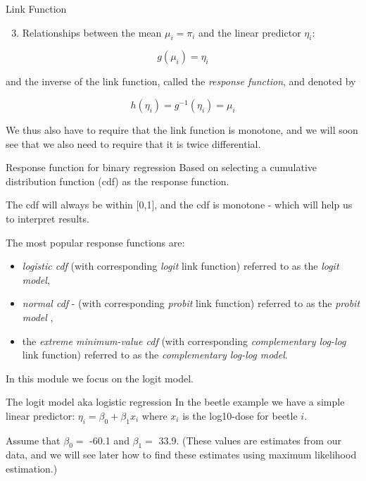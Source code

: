 \documentclass[
  ignorenonframetext,
]{beamer}
\providecommand{\tightlist}{%
  \setlength{\itemsep}{0pt}\setlength{\parskip}{0pt}}
\begin{document}
\begin{frame}
\begin{block}{Link Function}
\protect\hypertarget{link-function}{}
\begin{enumerate}
\setcounter{enumi}{2}
\tightlist
\item
  Relationships between the mean \(\mu_i=\pi_i\) and the linear
  predictor \(\eta_i\):
\end{enumerate}

\[
g(\mu_i)=\eta_i
\]

and the inverse of the link function, called the \emph{response
function}, and denoted by

\[
h(\eta_i)=g^{-1}(\eta_i)=\mu_i
\]

We thus also have to require that the link function is monotone, and we
will soon see that we also need to require that it is twice
differential.
\end{block}
\end{frame}

\begin{frame}
\begin{block}{Response function for binary regression}
\protect\hypertarget{response-function-for-binary-regression}{}
Based on selecting a cumulative distribution function (cdf) as the
response function.

The cdf will always be within {[}0,1{]}, and the cdf is monotone - which
will help us to interpret results.

The most popular response functions are:

\begin{itemize}
\tightlist
\item
  \emph{logistic cdf} (with corresponding \emph{logit} link function)
  referred to as the \emph{logit model},
\item
  \emph{normal cdf} - (with corresponding \emph{probit} link function)
  referred to as the \emph{probit model} ,
\item
  the \emph{extreme minimum-value cdf} (with corresponding
  \emph{complementary log-log} link function) referred to as the
  \emph{complementary log-log model}.
\end{itemize}

In this module we focus on the logit model.
\end{block}
\end{frame}

\begin{frame}
\begin{block}{The logit model aka logistic regression}
\protect\hypertarget{the-logit-model-aka-logistic-regression}{}
In the beetle example we have a simple linear predictor:
\(\eta_i=\beta_0+\beta_1 x_i\) where \(x_i\) is the log10-dose for
beetle \(i\).

Assume that \(\beta_0=\) -60.1 and \(\beta_1=\) 33.9. (These values are
estimates from our data, and we will see later how to find these
estimates using maximum likelihood estimation.)
\end{block}
\end{frame}
\end{document}
